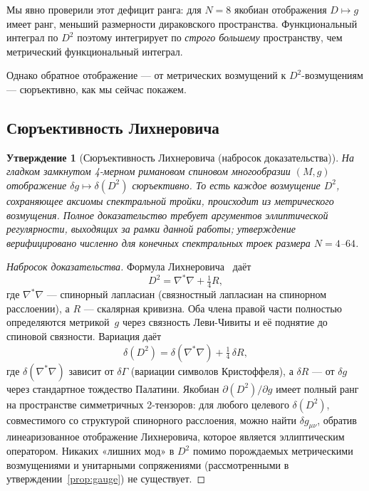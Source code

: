 \documentclass[12pt,a4paper]{article}
\newtheorem{proposition}[theorem]{Утверждение}
\theoremstyle{definition}
\theoremstyle{remark}
\begin{document}
Мы явно проверили этот дефицит ранга: для $N = 8$ якобиан
отображения $D \mapsto g$ имеет ранг, меньший размерности дираковского
пространства.  Функциональный интеграл по $D^2$ поэтому интегрирует
по \emph{строго большему} пространству, чем метрический функциональный
интеграл.

Однако обратное отображение --- от метрических возмущений к
$D^2$-возмущениям --- сюръективно, как мы сейчас покажем.

\subsection{Сюръективность Лихнеровича}

\begin{proposition}[Сюръективность Лихнеровича (набросок доказательства)]
\label{prop:lichnerowicz}
На гладком замкнутом 4-мерном римановом спиновом многообразии $(M, g)$
отображение $\delta g \mapsto \delta(D^2)$ сюръективно.  То есть
каждое возмущение $D^2$, сохраняющее аксиомы спектральной тройки,
происходит из метрического возмущения.  Полное доказательство требует
аргументов эллиптической регулярности, выходящих за рамки данной
работы; утверждение верифицировано численно для конечных спектральных
троек размера $N = 4$--$64$.
\end{proposition}

\begin{proof}[Набросок доказательства]
Формула Лихнеровича~\cite{Lichnerowicz:1963spinors} даёт
\begin{equation}
  D^2 = \nabla^*\nabla + \tfrac{1}{4}R,
  \label{eq:lichnerowicz}
\end{equation}
где $\nabla^*\nabla$ --- спинорный лапласиан (связностный лапласиан на
спинорном расслоении), а $R$ --- скалярная кривизна.  Оба члена правой
части полностью определяются метрикой~$g$ через связность
Леви-Чивиты и её поднятие до спиновой связности.  Вариация даёт
\begin{equation}
  \delta(D^2) = \delta(\nabla^*\nabla) + \tfrac{1}{4}\,\delta R,
\end{equation}
где $\delta(\nabla^*\nabla)$ зависит от $\delta\Gamma$ (вариации
символов Кристоффеля), а $\delta R$ --- от $\delta g$ через
стандартное тождество Палатини.  Якобиан $\partial(D^2)/\partial g$
имеет полный ранг на пространстве симметричных 2-тензоров: для
любого целевого $\delta(D^2)$, совместимого со структурой спинорного
расслоения, можно найти $\delta g_{\mu\nu}$, обратив линеаризованное
отображение Лихнеровича, которое является эллиптическим оператором.
Никаких «лишних мод» в $D^2$ помимо порождаемых метрическими
возмущениями и унитарными сопряжениями (рассмотренными в
утверждении~\ref{prop:gauge}) не существует.
\end{proof}
\end{document}
